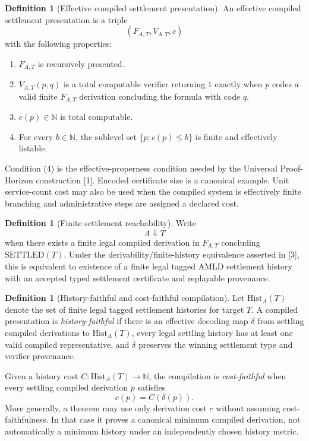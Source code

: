 \documentclass[11pt]{article}
\theoremstyle{definition}
\newtheorem{definition}[theorem]{Definition}
\newcommand{\SETTLED}{\ensuremath{\mathrm{SETTLED}}}
\newcommand{\Hist}{\mathrm{Hist}}
\begin{document}
\begin{definition}[Effective compiled settlement presentation]
An effective compiled settlement presentation is a triple
\[
(F_{A,T},V_{A,T},c)
\]
with the following properties:
\begin{enumerate}[label=(\arabic*)]
\item $F_{A,T}$ is recursively presented.
\item $V_{A,T}(p,q)$ is a total computable verifier returning $1$ exactly when $p$ codes a valid finite $F_{A,T}$ derivation concluding the formula with code $q$.
\item $c(p)\in\mathbb N$ is total computable.
\item For every $b\in\mathbb N$, the sublevel set $\{p:c(p)\le b\}$ is finite and effectively listable.
\end{enumerate}
Condition (4) is the effective-properness condition needed by the Universal Proof-Horizon construction [1]. Encoded certificate size is a canonical example. Unit service-count cost may also be used when the compiled system is effectively finite branching and administrative steps are assigned a declared cost.
\end{definition}

\begin{definition}[Finite settlement reachability]
Write
\[
A\Downarrow T
\]
when there exists a finite legal compiled derivation in $F_{A,T}$ concluding $\SETTLED(T)$. Under the derivability/finite-history equivalence asserted in [3], this is equivalent to existence of a finite legal tagged AMLD settlement history with an accepted typed settlement certificate and replayable provenance.
\end{definition}

\begin{definition}[History-faithful and cost-faithful compilation]
Let $\Hist_A(T)$ denote the set of finite legal tagged settlement histories for target $T$. A compiled presentation is \emph{history-faithful} if there is an effective decoding map $\delta$ from settling compiled derivations to $\Hist_A(T)$, every legal settling history has at least one valid compiled representative, and $\delta$ preserves the winning settlement type and verifier provenance.

Given a history cost $C:\Hist_A(T)\to\mathbb N$, the compilation is \emph{cost-faithful} when every settling compiled derivation $p$ satisfies
\[
c(p)=C(\delta(p)).
\]
More generally, a theorem may use only derivation cost $c$ without assuming cost-faithfulness. In that case it proves a canonical minimum compiled derivation, not automatically a minimum history under an independently chosen history metric.
\end{definition}
\end{document}
